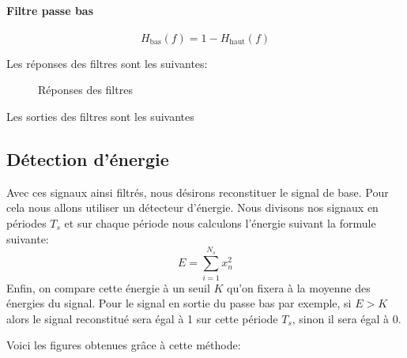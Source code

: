 \documentclass{article}
\begin{document}
\paragraph{Filtre passe bas}

\[
H_\text{bas}(f) = 1-H_\text{haut}(f)
\]

Les réponses des filtres sont les suivantes:

\begin{figure}[H]
	\centering
	\begin{minipage}{0.45\textwidth}
		\scalebox{0.5}{
		
	}
	\end{minipage}\hfill
	\begin{minipage}{0.45\textwidth}
		\scalebox{0.5}{
		
	}
	\end{minipage}
	\begin{minipage}{0.45\textwidth}
		\scalebox{0.5}{
		
	}
	\end{minipage}\hfill
	\begin{minipage}{0.45\textwidth}
		\scalebox{0.5}{
		
	}
	\end{minipage}
	\caption{Réponses des filtres}
	\label{fig:reponses-filtres}
\end{figure}

Les sorties des filtres sont les suivantes



\subsection{Détection d'énergie}


Avec ces signaux ainsi filtrés, nous désirons reconstituer le signal de base. Pour cela nous allons utiliser un détecteur d'énergie.
Nous divisons nos signaux en périodes $T_s$ et sur chaque période nous calculons l'énergie suivant la formule suivante:
\[
E=\sum_{i=1}^{N_s} x_n^2
\]
Enfin, on compare cette énergie à un seuil $K$ qu'on fixera à la moyenne des énergies du signal.
Pour le signal en sortie du passe bas par exemple, si $E>K$ alors le signal reconstitué sera égal à 1 sur cette période $T_s$, sinon il sera égal à 0.

Voici les figures obtenues grâce à cette méthode:

\begin{figure}
	\centering
	
\end{figure}
\end{document}

